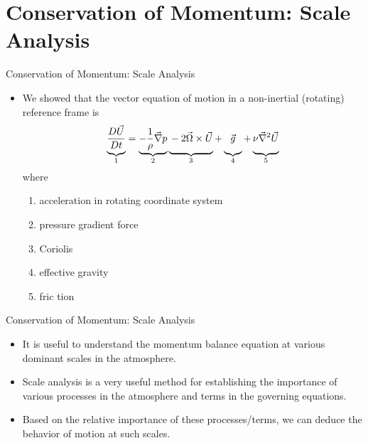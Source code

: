 \section{Conservation of Momentum: Scale Analysis} %
\begin{frame}{Conservation of Momentum: Scale Analysis}

\begin{itemize}
	\item We showed that the vector equation of motion in a non-inertial (rotating) reference frame is
	$$\underbrace{\vphantom{\frac{1}{\rho}\vec \nabla p}\frac{D\vec U}{Dt}}_{1} = \underbrace{-\frac{1}{\rho}\vec \nabla p}_{2} \underbrace{\vphantom{\frac{1}{\rho}\vec \nabla p}- 2\vec \Omega \times \vec{U}}_{3} + \underbrace{\vphantom{\frac{1}{\rho}\vec \nabla p}\vec g}_{4} + \underbrace{\vphantom{\frac{1}{\rho}\vec \nabla p}\nu \vec \nabla^2 \vec{U}}_{5}$$
	where
	\begin{enumerate}
		\item acceleration in rotating coordinate system
		\item pressure gradient force
		\item Coriolis
		\item effective gravity
		\item fric tion
	\end{enumerate}
\end{itemize}
\end{frame}
\begin{frame}{Conservation of Momentum: Scale Analysis}

\begin{itemize}
	\item It is useful to understand the momentum balance equation at various dominant scales in the atmosphere.
	\item Scale analysis is a very useful method for establishing the importance of various processes in the atmosphere and terms in the governing equations.
	\item Based on the relative importance of these processes/terms, we can deduce the behavior of motion at such scales.
\end{itemize}
\end{frame}

